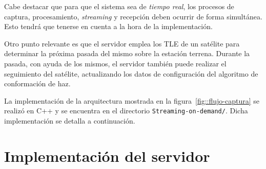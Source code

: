 \documentclass[../../main.tex]{subfiles}
\begin{document}
Cabe destacar que para que el sistema sea de \textit{tiempo real}, los procesos de captura, procesamiento, \textit{streaming} y recepción deben ocurrir de forma simultánea. Esto tendrá que tenerse en cuenta a la hora de la implementación.

Otro punto relevante es que el servidor emplea los TLE de un satélite para determinar la próxima pasada del mismo sobre la estación terrena. Durante la pasada, con ayuda de los mismos, el servidor también puede realizar el seguimiento del satélite, actualizando los datos de configuración del algoritmo de conformación de haz.


\begin{table}[H]
    \centering
    \caption{Requerimientos del cliente y el servidor en el diseño del sistema de envío de capturas en tiempo real.}\label{tab::reqs-cliente-servidor}
\end{table}


La implementación de la arquitectura mostrada en la figura~\ref{fig::flujo-captura} se realizó en C++ y se encuentra en el directorio \texttt{Streaming-on-demand/}. Dicha implementación se detalla a continuación.

\section{Implementación del servidor}
\end{document}
